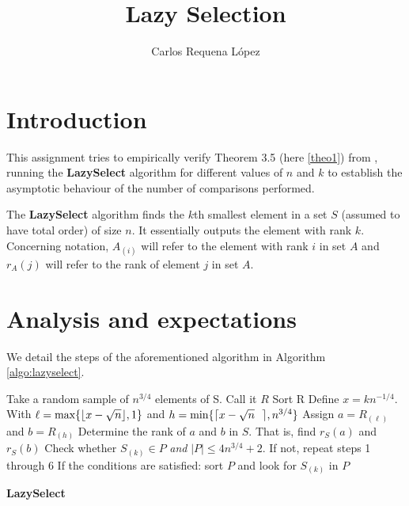 \documentclass[12pt,a4paper]{article}
\title{Lazy Selection}
\author{Carlos Requena López}
\DeclarePairedDelimiter{\ceil}{\lceil}{\rceil}
\DeclarePairedDelimiter\floor{\lfloor}{\rfloor}
\begin{document}
\maketitle
\pagestyle{fancy}

\section{Introduction}

This assignment tries to empirically verify Theorem 3.5 (here
\ref{theo1}) from \cite[p.~49]{motwani}, running the
\textbf{LazySelect} algorithm for different values of $n$ and $k$ to
establish the asymptotic behaviour of the number of comparisons
performed.

The \textbf{LazySelect} algorithm finds the $k$th smallest element in
a set $S$ (assumed to have total order) of size $n$. It essentially
outputs the element with rank $k$. Concerning notation, $A_{(i)}$ will
refer to the element with rank $i$ in set $A$ and $r_A(j)$ will refer
to the rank of element $j$ in set $A$.
\section{Analysis and expectations}

We detail the steps of the aforementioned algorithm in Algorithm
\ref{algo:lazyselect}.

\begin{algorithm}[h]
  \SetAlgoLined

  \nl Take a random sample of $n^{3/4}$ elements of S. Call it $R$\;
  \nl Sort R\;
  \nl Define $x = kn^{-1/4}$. With $\ell = \text{max}\{\floor{x -
    \sqrt{n}}, 1\}$ and $h = \text{min}\{\ceil{x - \sqrt{n}\ \ }, n^{3/4}\}$\;
  \nl Assign $a = R_{(\ell)}$ and $b = R_{(h)}$\;
  \nl Determine the rank of $a$ and $b$ in $S$. That is, find $r_{S}(a)$
  and $r_{S}(b)$\;
  \nl {}
  \nl Check whether $S_{(k)} \in P$ \emph{and} $|P| \leq 4n^{3/4} +
  2$. If not, repeat steps 1 through 6\;
  \nl If the conditions are satisfied: sort $P$ and look for $S_{(k)}$
  in $P$\;
  \caption{\bf LazySelect}
  \label{algo:lazyselect}
\end{algorithm}
\end{document}
